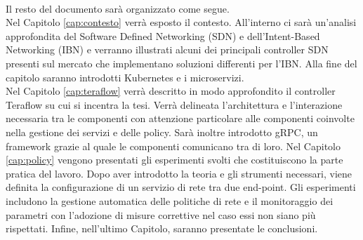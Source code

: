 \\Il resto del documento sarà organizzato come segue.
\\Nel Capitolo \ref{cap:contesto} verrà esposto il contesto. All'interno ci sarà un'analisi approfondita del Software Defined Networking (SDN) e dell'Intent-Based Networking (IBN)
e verranno illustrati alcuni dei principali controller SDN presenti sul mercato che implementano soluzioni differenti per l'IBN. Alla fine del capitolo saranno introdotti Kubernetes e i microservizi.
\\Nel Capitolo \ref{cap:teraflow} verrà descritto in modo approfondito il controller Teraflow su cui si incentra la tesi.
Verrà delineata l'architettura e l'interazione necessaria tra le componenti con attenzione particolare alle componenti coinvolte nella gestione dei servizi e delle policy.
Sarà inoltre introdotto gRPC, un framework grazie al quale le componenti comunicano tra di loro.
Nel Capitolo \ref{cap:policy} vengono presentati gli esperimenti svolti che costituiscono la parte pratica del lavoro.
Dopo aver introdotto la teoria e gli strumenti necessari, viene definita la configurazione di un servizio di rete tra due end-point. Gli esperimenti includono la gestione
automatica delle politiche di rete e il monitoraggio dei parametri con l'adozione di misure correttive nel caso essi non siano più rispettati.
Infine, nell'ultimo Capitolo, saranno presentate le conclusioni.

